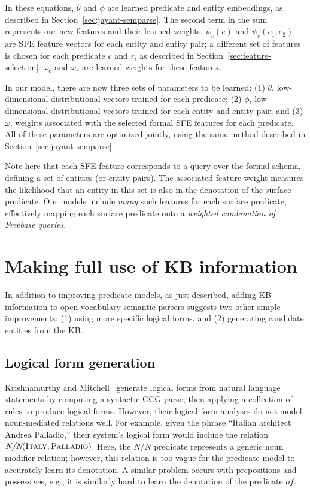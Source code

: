 \documentclass[11pt,letterpaper]{article}
\newcommand{\secref}[1]{Section~\ref{sec:#1}}
\newcommand{\lexicalpredicate}[1]{\ensuremath{\textit{#1}}}
\newcommand{\entity}[1]{\ensuremath{\textsc{#1}}}
\begin{document}
In these equations, $\theta$ and $\phi$ are learned predicate and entity embeddings, as described
in \secref{jayant-semparse}. The second term in the sum represents our new features and their
learned weights.  $\psi_c(e)$ and $\psi_r(e_1, e_2)$ are SFE feature vectors for each entity and
entity pair; a different set of features is chosen for each predicate $c$ and $r$, as described in
\secref{feature-selection}.  $\omega_c$ and $\omega_r$ are learned weights for these features.

In our model, there are now three sets of parameters to be learned: (1) $\theta$, low-dimensional
distributional vectors trained for each predicate; (2) $\phi$, low-dimensional distributional
vectors trained for each entity and entity pair; and (3) $\omega$, weights associated with the
selected formal SFE features for each predicate.  All of these parameters are optimized jointly,
using the same method described in \secref{jayant-semparse}.

Note here that each SFE feature corresponds to a query over the formal schema, defining a set of
entities (or entity pairs).  The associated feature weight measures the likelihood that an entity
in this set is also in the denotation of the surface predicate. Our models include \emph{many} such
features for each surface predicate, effectively mapping each surface predicate onto a
\emph{weighted combination of Freebase queries}.

\section{Making full use of KB information}

In addition to improving predicate models, as just described, adding KB information to open
vocabulary semantic parsers suggests two other simple improvements: (1) using more specific logical
forms, and (2) generating candidate entities from the KB.

\subsection{Logical form generation}
\label{sec:better-lfs}

Krishnamurthy and Mitchell~ generate logical
forms from natural language statements by computing a syntactic CCG parse, then applying a
collection of rules to produce logical forms. However, their logical form analyses do not model
noun-mediated relations well. For example, given the phrase ``Italian architect Andrea Palladio,''
their system's logical form would include the relation $\lexicalpredicate{N/N}(\entity{Italy},
\entity{Palladio})$. Here, the \lexicalpredicate{N/N} predicate represents a generic noun modifier
relation; however, this relation is too vague for the predicate model to accurately learn its
denotation. A similar problem occurs with prepositions and possessives, e.g., it is similarly hard
to learn the denotation of the predicate \lexicalpredicate{of}.
\end{document}
